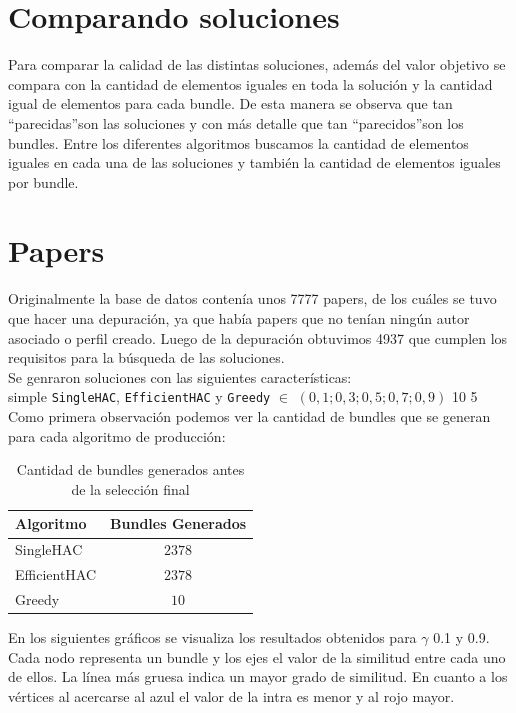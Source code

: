 \section{Comparando soluciones}
Para comparar la calidad de las distintas soluciones, además del valor objetivo se compara con 
la cantidad de elementos iguales en toda la solución y la cantidad igual de elementos para cada 
bundle. De esta manera se observa que tan \textquotedblleft parecidas\textquotedblright son las 
soluciones y con más detalle que tan \textquotedblleft parecidos\textquotedblright son los bundles. 
Entre los diferentes algoritmos buscamos la cantidad de elementos iguales en cada una de las 
soluciones y también la cantidad de elementos iguales por bundle.
\section{Papers}
Originalmente la base de datos contenía unos 7777 papers, de los cuáles se tuvo que hacer una 
depuración, ya que había papers que no tenían ningún autor asociado o perfil creado. Luego de la 
depuración obtuvimos 4937 que cumplen los requisitos para la búsqueda de las soluciones.\\
Se genraron soluciones con las siguientes características:\\
\Solucion
{}
{simple}
{\texttt{SingleHAC}, \texttt{EfficientHAC} y \texttt{Greedy}}
{$\in$ $(0,1; 0,3; 0,5; 0,7; 0,9)$}
{10}
{5}
Como primera observación podemos ver la cantidad de bundles que se generan para cada algoritmo de 
producción:\\
\begin{table}[h]
  \centering
  \resizebox{0.5\textwidth}{!} {
    \begin{tabular}{|lc|}
    \hline
    Algoritmo & Bundles Generados \\
    \hline
    SingleHAC & $2378$ \\
    EfficientHAC & $2378$ \\
    Greedy & $10$ \\
    \hline
    \end{tabular}
  }
    \caption {Cantidad de bundles generados antes de la selección final}
\end{table}

En los siguientes gráficos se visualiza los resultados obtenidos para $\gamma$ 0.1 y 0.9. Cada 
nodo representa un bundle y los ejes el valor de la similitud entre cada uno de ellos. La línea más 
gruesa indica un mayor grado de similitud. En cuanto a los vértices al acercarse al azul el valor 
de la intra es menor y al rojo mayor.

